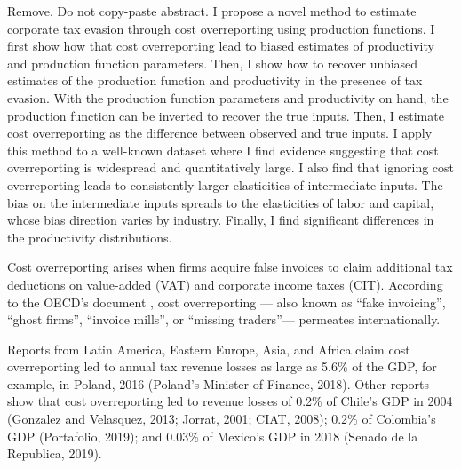 \documentclass[
  12pt]{article}
\theoremstyle{definition}
\theoremstyle{remark}
\begin{document}
\begin{anfxnote}{Remove. Do not copy-paste abstract.}
I propose a novel method to estimate corporate tax evasion through cost
overreporting using production functions. I first show how that cost
overreporting lead to biased estimates of productivity and production
function parameters. Then, I show how to recover unbiased estimates of
the production function and productivity in the presence of tax evasion.
With the production function parameters and productivity on hand, the
production function can be inverted to recover the true inputs. Then, I
estimate cost overreporting as the difference between observed and true
inputs. I apply this method to a well-known dataset where I find
evidence suggesting that cost overreporting is widespread and
quantitatively large. I also find that ignoring cost overreporting leads
to consistently larger elasticities of intermediate inputs. The bias on
the intermediate inputs spreads to the elasticities of labor and
capital, whose bias direction varies by industry. Finally, I find
significant differences in the productivity distributions.

\end{anfxnote}

 Cost overreporting arises
when firms acquire false invoices to claim additional tax deductions on
value-added (VAT) and corporate income taxes (CIT). According to the
OECD's document \citet{OECD2017}, cost overreporting --- also known as
``fake invoicing'', ``ghost firms'', ``invoice mills'', or ``missing
traders''--- permeates internationally.

 Reports from
Latin America, Eastern Europe, Asia, and Africa claim cost overreporting
led to annual tax revenue losses as large as 5.6\% of the GDP, for
example, in Poland, 2016 (Poland's Minister of Finance, 2018). Other
reports show that cost overreporting led to revenue losses of 0.2\% of
Chile's GDP in 2004 (Gonzalez and Velasquez, 2013; Jorrat, 2001; CIAT,
2008); 0.2\% of Colombia's GDP (Portafolio, 2019); and 0.03\% of
Mexico's GDP in 2018 (Senado de la Republica, 2019). 
\end{document}
